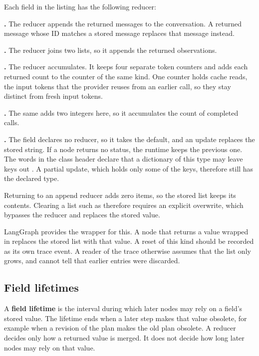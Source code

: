 Each field in the listing has the following reducer:
\bi
\item \textbf{.} The reducer  appends the returned messages
to the conversation. A returned message whose ID matches a stored message replaces that message
instead.
\item \textbf{.} The reducer  joins two lists, so it
appends the returned observations.
\item \textbf{.} The reducer  accumulates. It keeps four separate
token counters and adds each returned count to the counter of the same kind. One counter holds cache
reads, the input tokens that the provider reuses from an earlier call, so they stay distinct from
fresh input tokens.
\item \textbf{.} The same  adds two integers here, so it
accumulates the count of completed calls.
\item \textbf{.} The field declares no reducer, so it takes the default, and an
update replaces the stored string. If a node returns no status, the runtime keeps the previous one.
\ei
The words  in the class header declare that a dictionary of this type may
leave keys out \citep{pep589}. A partial update, which holds only some of the keys, therefore still
has the declared type.

Returning \demoref{[]} to an append reducer adds zero items, so the stored list keeps its contents.
Clearing a list such as  therefore requires an explicit overwrite, which
bypasses the reducer and replaces the stored value.

LangGraph provides the wrapper  for this. A node that returns a value wrapped in
 replaces the stored list with that value. A reset of this kind should be
recorded as its own trace event. A reader of the trace otherwise assumes that the list only grows,
and cannot tell that earlier entries were discarded.

\subsection{Field lifetimes}
\label{sec:records-lifetimes}

A \textbf{field lifetime} is the interval during which later nodes may rely on a field's stored
value. The lifetime ends when a later step makes that value obsolete, for example when a revision of
the plan makes the old plan obsolete. A reducer decides only how a returned value is merged. It does
not decide how long later nodes may rely on that value.

